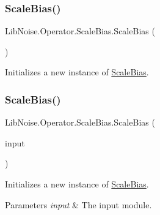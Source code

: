 \subsubsection{\texorpdfstring{Scale\+Bias()}{ScaleBias()}\hspace{0.1cm}{\footnotesize\ttfamily [1/3]}}
{\footnotesize\ttfamily Lib\+Noise.\+Operator.\+Scale\+Bias.\+Scale\+Bias (\begin{DoxyParamCaption}{ }\end{DoxyParamCaption})}



Initializes a new instance of \hyperlink{class_lib_noise_1_1_operator_1_1_scale_bias}{Scale\+Bias}. 

\mbox{\label{class_lib_noise_1_1_operator_1_1_scale_bias_a24ea8f69951c50dafad424b08b56c02c}} 
\subsubsection{\texorpdfstring{Scale\+Bias()}{ScaleBias()}\hspace{0.1cm}{\footnotesize\ttfamily [2/3]}}
{\footnotesize\ttfamily Lib\+Noise.\+Operator.\+Scale\+Bias.\+Scale\+Bias (\begin{DoxyParamCaption}\item[{\hyperlink{class_lib_noise_1_1_module_base}{Module\+Base}}]{input }\end{DoxyParamCaption})}



Initializes a new instance of \hyperlink{class_lib_noise_1_1_operator_1_1_scale_bias}{Scale\+Bias}. 


\begin{DoxyParams}{Parameters}
{\em input} & The input module.\\
\hline
\end{DoxyParams}
\mbox{\label{class_lib_noise_1_1_operator_1_1_scale_bias_abdb67954855a2d39754ec40cd782f3c0}} 
